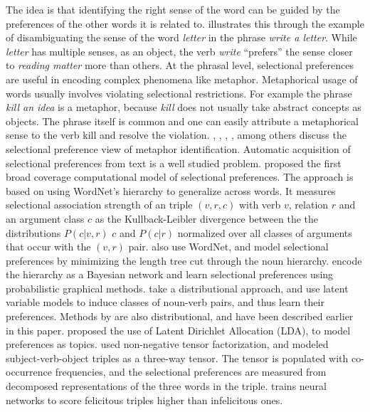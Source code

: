 The idea is that identifying the right sense of the word can be guided by the 
preferences of the other words it is related to.  \cite{resnik1997selectional}
illustrates this through the example of disambiguating the sense of the word 
\textit{letter} in the phrase \textit{write a letter}.
While \textit{letter} has multiple senses, as an object, the verb \textit{write} 
``prefers'' the sense closer to \textit{reading matter} more than others.
At the phrasal level, selectional preferences are useful in encoding complex 
phenomena like metaphor.  Metaphorical usage of words usually involves violating 
selectional restrictions.
For example the phrase \textit{kill an idea} is a metaphor, because 
\textit{kill} does not usually take abstract concepts as objects.  The phrase 
itself is common and
one can easily attribute a metaphorical sense to the verb kill and resolve the 
violation.  \cite{wilks2007making}, \cite{wilks2007preferential}, 
\cite{krishnakumaran2007hunting},
\cite{shutova2013statistical}, among others discuss the selectional preference 
view of metaphor identification.
Automatic acquisition of selectional preferences from text is a well studied 
problem.  \cite{resnik1996selectional} proposed the first broad coverage 
computational model of selectional preferences.  The approach is based on using 
WordNet's hierarchy to generalize across words.
It measures selectional association strength of an triple $(v, r, c)$ with verb 
$v$, relation $r$ and an argument class $c$ as the Kullback-Leibler divergence 
between the the distributions $P(c|v, r)$  $c$
and $P(c|r)$ normalized over all classes of arguments that occur with the $(v, 
r)$ pair.  \cite{abe1996learning} also use WordNet, and model selectional 
preferences by minimizing the length tree cut through
the noun hierarchy.  \cite{ciaramita2000explaining} encode the hierarchy as a 
Bayesian network and learn selectional preferences using probabilistic graphical 
methods.
\cite{rooth1999inducing} take a distributional approach, and use latent variable 
models to induce classes of noun-verb pairs, and thus learn their preferences.  
Methods by \cite{erk2007simple,erk2010flexible}
are also distributional, and have been described earlier in this paper.  
\cite{seaghdha2010latent} proposed the use of Latent Dirichlet Allocation (LDA), 
to model preferences as topics.  \cite{van2009non} used
non-negative tensor factorization, and modeled subject-verb-object triples as a 
three-way tensor.  The tensor is populated with co-occurrence frequencies, and 
the selectional preferences are measured from decomposed
representations of the three words in the triple. \cite{van2014neural} trains 
neural networks to score felicitous triples higher than infelicitous ones.


